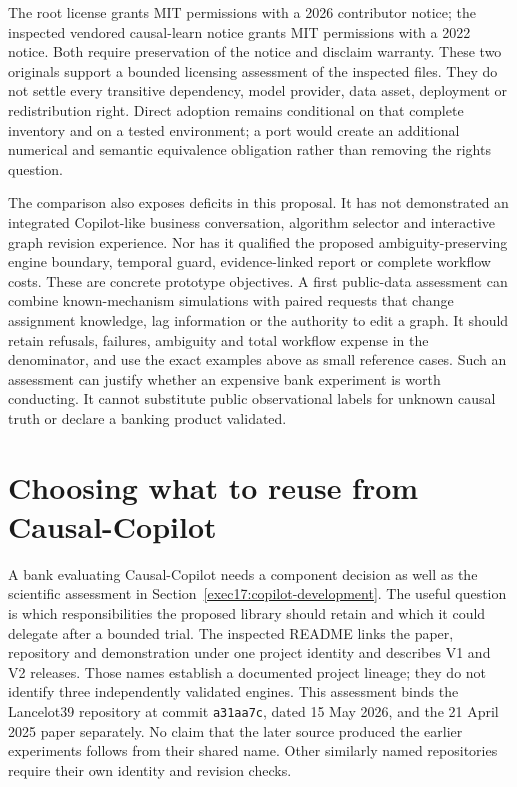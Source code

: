 The root license grants MIT permissions with a 2026 contributor notice; the
inspected vendored causal-learn notice grants MIT permissions with a 2022
notice. Both require preservation of the notice and disclaim warranty. These
two originals support a bounded licensing assessment of the inspected files.
They do not settle every transitive dependency, model provider, data asset,
deployment or redistribution right. Direct adoption remains conditional on
that complete inventory and on a tested environment; a port would create an
additional numerical and semantic equivalence obligation rather than removing
the rights question.~\citep{exec17_copilot_rights}

The comparison also exposes deficits in this proposal. It has not demonstrated
an integrated Copilot-like business conversation, algorithm selector and
interactive graph revision experience. Nor has it qualified the proposed
ambiguity-preserving engine boundary, temporal guard, evidence-linked report
or complete workflow costs. These are concrete prototype objectives. A first
public-data assessment can combine known-mechanism simulations with paired
requests that change assignment knowledge, lag information or the authority
to edit a graph. It should retain refusals, failures, ambiguity and total
workflow expense in the denominator, and use the exact examples above as
small reference cases. Such an assessment can justify whether an expensive
bank experiment is worth conducting. It cannot substitute public observational
labels for unknown causal truth or declare a banking product validated.
\label{exec17:copilot-development-end}


\section{Choosing what to reuse from Causal-Copilot}
\label{sec:exec25-copilot-reuse}

A bank evaluating Causal-Copilot needs a component decision as well as the
scientific assessment in Section~\ref{exec17:copilot-development}. The useful
question is which responsibilities the proposed library should retain and
which it could delegate after a bounded trial. The inspected README links the
paper, repository and demonstration under one project identity and describes
V1 and V2 releases. Those names establish a documented project lineage; they
do not identify three independently validated engines. This assessment binds
the Lancelot39 repository at commit \texttt{a31aa7c}, dated 15 May 2026, and the
21 April 2025 paper separately. No claim that the later source produced the
earlier experiments follows from their shared name. Other similarly named
repositories require their own identity and revision checks.
\citep{exec17_copilot_paper,exec17_copilot_code}

